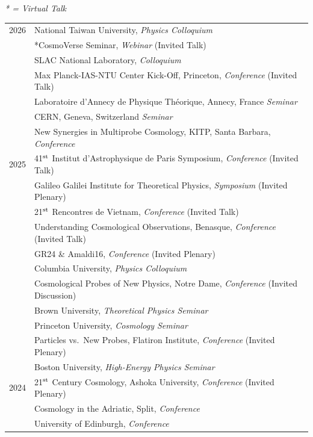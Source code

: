 \textit{* = Virtual Talk}

\begin{tabular}{l @{\hspace{4ex}} l}
2026
& National Taiwan University, \textit{Physics Colloquium}\\
& *CosmoVerse Seminar, \textit{Webinar} (Invited Talk)\\
& SLAC National Laboratory, \textit{Colloquium}\\
& Max Planck-IAS-NTU Center Kick-Off, Princeton, \textit{Conference} (Invited Talk)\\
& Laboratoire d'Annecy de Physique Th\'{e}orique, Annecy, France \textit{Seminar}\\
& CERN, Geneva, Switzerland \textit{Seminar}\\
& New Synergies in Multiprobe Cosmology, KITP, Santa Barbara, \textit{Conference}\smallskip\\
2025
& 41$^{\rm st}$ Institut d'Astrophysique de Paris Symposium, \textit{Conference} (Invited Talk)\\
& Galileo Galilei Institute for Theoretical Physics, \textit{Symposium} (Invited Plenary)\\ 
& 21$^{\rm st}$ Rencontres de Vietnam, \textit{Conference} (Invited Talk)\\
& Understanding Cosmological Observations, Benasque, \textit{Conference} (Invited Talk)\\
& GR24 \& Amaldi16, \textit{Conference} (Invited Plenary)\\
& Columbia University, \textit{Physics Colloquium}\\
& Cosmological Probes of New Physics, Notre Dame, \textit{Conference} (Invited Discussion)\\
& Brown University, \textit{Theoretical Physics Seminar}\\
& Princeton University, \textit{Cosmology Seminar}\\
& Particles vs.\ New Probes, Flatiron Institute, \textit{Conference} (Invited Plenary)\\
& Boston University, \textit{High-Energy Physics Seminar}\smallskip\\
2024
& 21$^{\rm st}$ Century Cosmology, Ashoka University, \textit{Conference} (Invited Plenary)\\
& Cosmology in the Adriatic, Split, \textit{Conference}\\
& University of Edinburgh, \textit{Conference}\\

\end{tabular}
